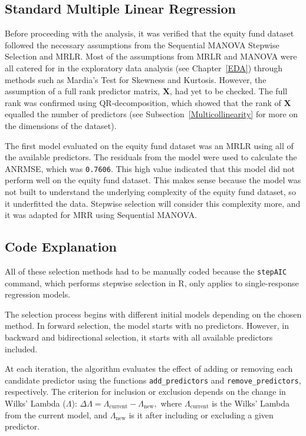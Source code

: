 \documentclass[11pt]{report} %
\begin{document}
\subsection{Standard Multiple Linear Regression}
\label{Standard MRLR}
Before proceeding with the analysis, it was verified that the equity fund dataset followed the necessary assumptions from the Sequential MANOVA Stepwise Selection and MRLR. Most of the assumptions from MRLR and MANOVA were all catered for in the exploratory data analysis (see Chapter~\ref{EDA}) through methods such as Mardia's Test for Skewness and Kurtosis. However, the assumption of a full rank predictor matrix, $\mathbf{X}$, had yet to be checked. The full rank was confirmed using QR-decomposition,  which showed that the rank of $\mathbf{X}$ equalled the number of predictors (see Subsection~\ref{Multicollinearity} for more on the dimensions of the dataset).

The first model evaluated on the equity fund dataset was an MRLR using all of the available predictors. The residuals from the model were used to calculate the ANRMSE, which was \texttt{0.7606}. This high value indicated that this model did not perform well on the equity fund dataset. This makes sense because the model was not built to understand the underlying complexity of the equity fund dataset, so it underfitted the data. Stepwise selection will consider this complexity more, and it was adapted for MRR using Sequential MANOVA.

\subsection{Code Explanation}
All of these selection methods had to be manually coded because the \texttt{stepAIC} command, which performs stepwise selection in R, only applies to single-response regression models. 

The selection process begins with different initial models depending on the chosen method. In forward selection, the model starts with no predictors. However, in backward and bidirectional selection, it starts with all available predictors included. %

At each iteration, the algorithm evaluates the effect of adding or removing each candidate predictor using the functions \texttt{add\_predictors} and \texttt{remove\_predictors}, respectively. The criterion for inclusion or exclusion depends on the change in Wilks' Lambda (\( \Lambda \)):
\(
\Delta \Lambda = \Lambda_{\text{current}} - \Lambda_{\text{new}},
\)
where \( \Lambda_{\text{current}} \) is the Wilks' Lambda from the current model, and \( \Lambda_{\text{new}} \) is it after including or excluding a given predictor.
\end{document}
